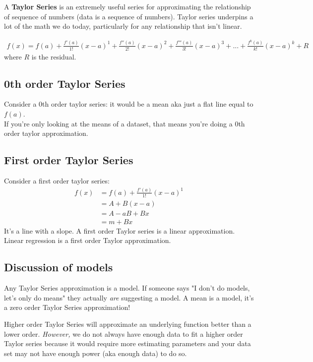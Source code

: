 \documentclass{article}
\begin{document}
A \textbf{Taylor Series} is an extremely useful series for approximating the relationship of sequence of numbers (data is a sequence of numbers). Taylor series underpins a lot of the math we do today, particularly for any relationship that isn't linear. 

\begin{align}
    f(x) = f(a) + \frac{f'(a)}{1!}(x-a)^1 + \frac{f''(a)}{2!}(x-a)^2 + \frac{f'''(a)}{3!}(x-a)^3 + ... + \frac{f^k(a)}{k!}(x-a)^k + R
\end{align}
where $R$ is the residual.\\


\subsection{0th order Taylor Series}
Consider a 0th order taylor series: it would be a mean aka just a flat line equal to $f(a)$. \\

If you're only looking at the means of a dataset, that means you're doing a 0th order taylor approximation.

\subsection{First order Taylor Series}

Consider a first order taylor series: 
\begin{align}
    f(x) &= f(a) + \frac{f'(a)}{1!}(x-a)^1 \\
    &= A + B (x-a) \\
    &= A -aB + Bx\\
    &= m + Bx
\end{align}
It's a line with a slope. A first order Taylor series is a linear approximation. Linear regression is a first order Taylor approximation. \\

\subsection{Discussion of models}
Any Taylor Series approximation is a model. If someone says "I don't do models, let's only do means" they actually \textit{are} suggesting a model. A mean is a model, it's a zero order Taylor Series approximation! 

Higher order Taylor Series will approximate an underlying function better than a lower order. \textit{However,} we do not always have enough data to fit a higher order Taylor series because it would require more estimating parameters and your data set may not have enough power (aka enough data) to do so. \\
\end{document}
